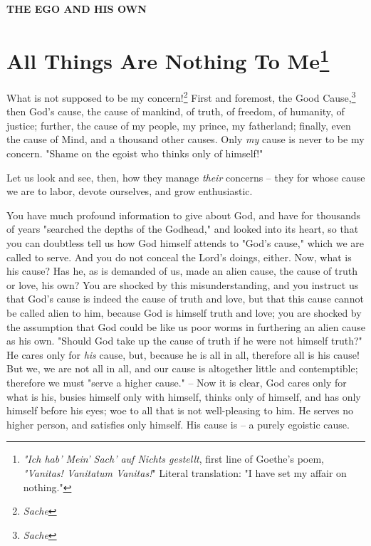 \documentclass[a4paper]{book}
\begin{document}
\vspace{200pt}

\begin{center}
\textbf{THE EGO AND HIS OWN}
\end{center}


\chapter[All Things Are Nothing To Me]{\centering All Things 
Are Nothing To Me\footnote{\textit{"{}Ich hab' 
Mein' Sach' auf Nichts gestellt}, first line of Goethe's poem, 
\textit{"{}Vanitas! Vanitatum Vanitas!}"{} Literal translation: "{}I have set 
my affair on nothing."{}}}

What is not supposed to be my concern!\footnote{\textit{Sache}} First and 
foremost, the Good Cause,\footnote{\textit{Sache}} then God's cause, the cause 
of mankind, of truth, of freedom, of humanity, of justice; further, the cause 
of my people, my prince, my fatherland; finally, even the cause of Mind, and a 
thousand other causes. Only \textit{my} cause is never to be my concern. 
"{}Shame on the egoist who thinks only of himself!"{}

Let us look and see, then, how they manage \textit{their} concerns -- they for 
whose cause we are to labor, devote ourselves, and grow enthusiastic.

You have much profound information to give about God, and have for thousands 
of years "{}searched the depths of the Godhead,"{} and looked into its heart, 
so that you can doubtless tell us how God himself attends to "{}God's 
cause,"{} which we are called to serve. And you do not conceal the Lord's 
doings, either. Now, what is his cause? Has he, as is demanded of us, made an 
alien cause, the cause of truth or love, his own? You are shocked by this 
misunderstanding, and you instruct us that God's cause is indeed the cause of 
truth and love, but that this cause cannot be called alien to him, because God 
is himself truth and love; you are shocked by the assumption that God could be 
like us poor worms in furthering an alien cause as his own. "{}Should God take 
up the cause of truth if he were not himself truth?"{} He cares only for 
\textit{his} cause, but, because he is all in all, therefore all is his cause! 
But we, we are not all in all, and our cause is altogether little and 
contemptible; therefore we must "{}serve a higher cause."{} -- Now it is 
clear, God cares only for what is his, busies himself only with himself, 
thinks only of himself, and has only himself before his eyes; woe to all that 
is not well-pleasing to him. He serves no higher person, and satisfies only 
himself. His cause is -- a purely egoistic cause.
\end{document}
